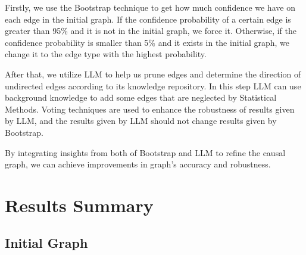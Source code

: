 \documentclass{article}
\begin{document}
Firstly, we use the Bootstrap technique to get how much confidence we have on each edge in the initial graph.
If the confidence probability of a certain edge is greater than 95\% and it is not in the initial graph, we force it.
Otherwise, if the confidence probability is smaller than 5\% and it exists in the initial graph, we change it to the edge type with the highest probability.
            
After that, we utilize LLM to help us prune edges and determine the direction of undirected edges according to its knowledge repository.
In this step LLM can use background knowledge to add some edges that are neglected by Statistical Methods.
Voting techniques are used to enhance the robustness of results given by LLM, and the results given by LLM should not change results given by Bootstrap.

By integrating insights from both of Bootstrap and LLM to refine the causal graph, we can achieve improvements in graph's accuracy and robustness.
            
\section{Results Summary}

\subsection{Initial Graph}
\end{document}
